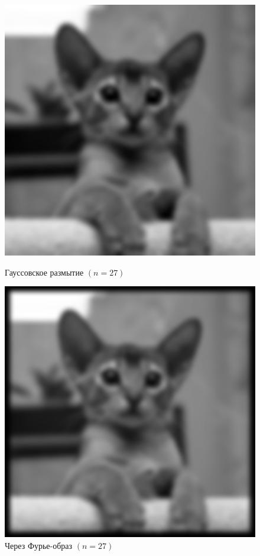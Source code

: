 \documentclass[a4paper]{article}
\begin{document}
\begin{figure}[H]
    \hspace{5em}
    \begin{minipage}{0.35\textwidth}
        \includegraphics[width=\textwidth]{sources/2second/gauss_27.png}
        \caption{Гауссовское размытие $(n = 27)$}
    \end{minipage}\hfill
    \begin{minipage}{0.35\textwidth}
        \includegraphics[width=\textwidth]{sources/2second/gauss_fft_27.png}
        \caption{Через Фурье-образ $(n = 27)$}
    \end{minipage}
    \hspace{5em}
\end{figure}
\end{document}

